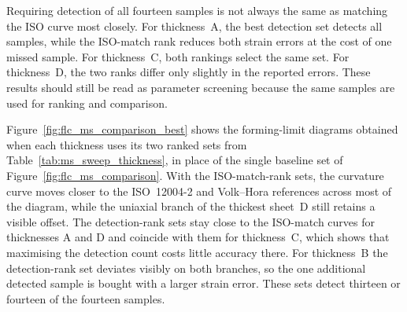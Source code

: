\begin{table}[H]
    \centering
    \scriptsize
    \caption[Min--Stoughton parameter rankings across thicknesses]{Min--Stoughton parameter rankings from the Euler sweep.}
    \label{tab:ms_sweep_thickness}
\end{table}

Requiring detection of all fourteen samples is not always the same as matching
the ISO curve most closely. For thickness~A, the best detection set detects all
samples, while the ISO-match rank reduces both strain errors at the cost of one
missed sample. For thickness~C, both rankings select the same set. For thickness~D, the
two ranks differ only slightly in the reported errors. These results should
still be read as parameter screening because the same samples are used for
ranking and comparison.

Figure~\ref{fig:flc_ms_comparison_best} shows the forming-limit diagrams
obtained when each thickness uses its two ranked sets from
Table~\ref{tab:ms_sweep_thickness}, in place of the single baseline set of
Figure~\ref{fig:flc_ms_comparison}. With the ISO-match-rank sets, the
curvature curve moves closer to the ISO~12004-2 and Volk--Hora references
across most of the diagram, while the uniaxial branch of the thickest sheet~D
still retains a visible offset. The detection-rank sets stay close to the
ISO-match curves for thicknesses A and D and coincide with them for thickness~C,
which shows that maximising the detection count costs little accuracy there.
For thickness~B the detection-rank set deviates visibly on both branches, so the
one additional detected sample is bought with a larger strain error. These
sets detect thirteen or fourteen of the fourteen samples.

